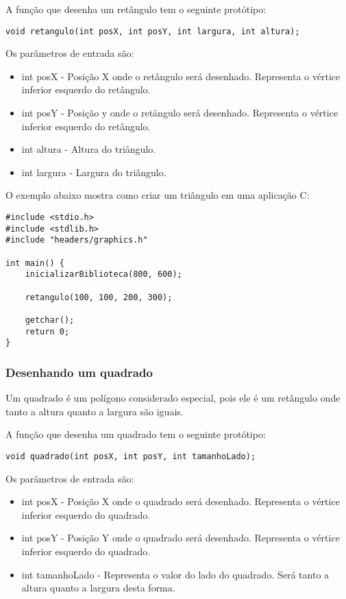 \documentclass[12pt, %
openright,
oneside, %
a4paper,    %
brazil]{facom-ufu-abntex2}
\begin{document}
A função que desenha um retângulo tem o seguinte protótipo:

\begin{lstlisting}
void retangulo(int posX, int posY, int largura, int altura);
\end{lstlisting}

Os parâmetros de entrada são:

\begin{itemize}
    \item int posX - Posição X onde o retângulo será desenhado. Representa o vértice inferior esquerdo do retângulo.
    \item int posY - Posição y onde o retângulo será desenhado. Representa o vértice inferior esquerdo do retângulo.
    \item int altura - Altura do triângulo.
    \item int largura - Largura do triângulo.
\end{itemize}

O exemplo abaixo mostra como criar um triângulo em uma aplicação C:

\begin{lstlisting}
#include <stdio.h>
#include <stdlib.h>
#include "headers/graphics.h"

int main() {
    inicializarBiblioteca(800, 600);

    retangulo(100, 100, 200, 300);

    getchar();
    return 0;
}
\end{lstlisting}

\subsubsection{Desenhando um quadrado}
Um quadrado é um polígono considerado especial, pois ele é um retângulo onde tanto a altura quanto a largura são iguais.

A função que desenha um quadrado tem o seguinte protótipo:

\begin{lstlisting}
void quadrado(int posX, int posY, int tamanhoLado);
\end{lstlisting}

Os parâmetros de entrada são:

\begin{itemize}
    \item int posX - Posição X onde o quadrado será desenhado. Representa o vértice inferior esquerdo do quadrado.
    \item int posY - Posição Y onde o quadrado será desenhado. Representa o vértice inferior esquerdo do quadrado.
    \item int tamanhoLado - Representa o valor do lado do quadrado. Será tanto a altura quanto a largura desta forma.
\end{itemize}
\end{document}
